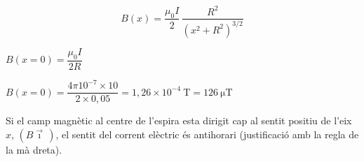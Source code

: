 \begin{solapartat}
\[ B(x) = \frac{\mu_0 I}{2}\,\frac{R^2}{(x^2+R^2)^{3/2}} \]

 $B(x = 0) = \dfrac{\mu_0 I}{2R}$

 $B(x = 0) = \dfrac{4\pi 10^{-7}\times 10}{2\times 0,05} = 1,26\times 10^{-4}\ \mathrm{T} = 126\ \mathrm{\mu T}$
\end{solapartat}

\begin{solapartat}
 Si el camp magnètic al centre de l'espira esta dirigit cap al sentit positiu de l'eix $x$, $(B\vec{\imath}\,)$, el sentit del corrent elèctric és antihorari (justificació amb la regla de la mà dreta).

\end{solapartat}
